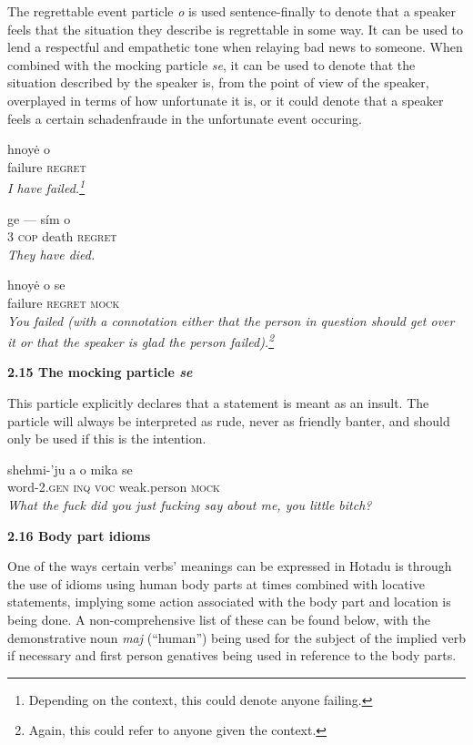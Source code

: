 \documentclass{article}[10pt]
\begin{document}
The regrettable event particle \emph{o} is used sentence-finally to denote that a speaker feels that the situation they describe is regrettable in some way. It can be used to lend a respectful and empathetic tone when relaying bad news to someone. When combined with the mocking particle \emph{se}, it can be used to denote that the situation described by the speaker is, from the point of view of the speaker, overplayed in terms of how unfortunate it is, or it could denote that a speaker feels a certain schadenfraude in the unfortunate event occuring.
\begin{exe}
\ex
\gll hnoy\.{e} o\\
failure \textsc{regret}\\
\trans \emph{I have failed.\emph{\footnote{Depending on the context, this could denote anyone failing.}}}

\ex
\gll ge --- s\'{i}m o\\
3 \textsc{cop} death \textsc{regret}\\
\trans \emph{They have died.}

\ex
\gll hnoy\.{e} o se\\
failure \textsc{regret} \textsc{mock}\\
\trans \emph{You failed \emph{(with a connotation either that the person in question should get over it or that the speaker is glad the person failed).\footnote{Again, this could refer to anyone given the context.}}}
\end{exe}

{\bf 2.15 The mocking particle \emph{se}}

This particle explicitly declares that a statement is meant as an insult. The particle will always be interpreted as rude, never as friendly banter, and should only be used if this is the intention.
\begin{exe}
\ex
\gll shehmi-'ju a o mika se\\
word-2.\textsc{gen} \textsc{inq} \textsc{voc} weak.person \textsc{mock}\\
\trans \emph{What the fuck did you just fucking say about me, you little bitch?}
\end{exe}

{\bf 2.16 Body part idioms}

One of the ways certain verbs' meanings can be expressed in Hotadu is through the use of idioms using human body parts at times combined with locative statements, implying some action associated with the body part and location is being done. A non-comprehensive list of these can be found below, with the demonstrative noun \emph{maj} (``human'') being used for the subject of the implied verb if necessary and first person genatives being used in reference to the body parts.
\end{document}
